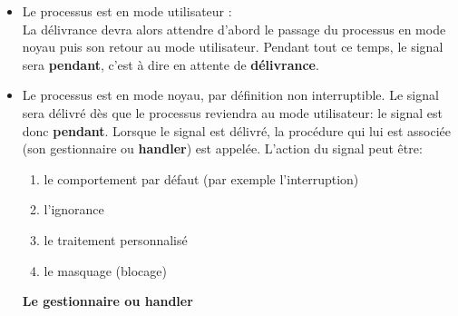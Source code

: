 \documentclass[10pt,french,A4]{article}
\theoremstyle{plain}
\begin{document}
\begin{itemize}
\item
  Le processus est en mode utilisateur :\\
  La délivrance devra alors
  attendre d'abord le passage du processus en mode noyau puis son
  retour au mode utilisateur. Pendant tout ce temps, le signal sera
  \textbf{pendant}, c'est à dire en attente de \textbf{délivrance}.
\item
  Le processus est en mode noyau, par définition non interruptible. Le
  signal sera délivré dès que le processus reviendra au mode
  utilisateur: le signal est donc \textbf{pendant}. Lorsque le signal est délivré, la procédure qui lui
  est associée (son gestionnaire ou\textbf{ handler})  est appelée. L'action du signal peut être:
  \begin{enumerate}
      \item  le comportement par défaut (par exemple l'interruption)
      \item l'ignorance
      \item le traitement personnalisé
      \item le masquage (blocage)
  \end{enumerate}
\begin{center}
    \textbf{Le gestionnaire ou handler}
\end{center}



\end{itemize}
\end{document}
